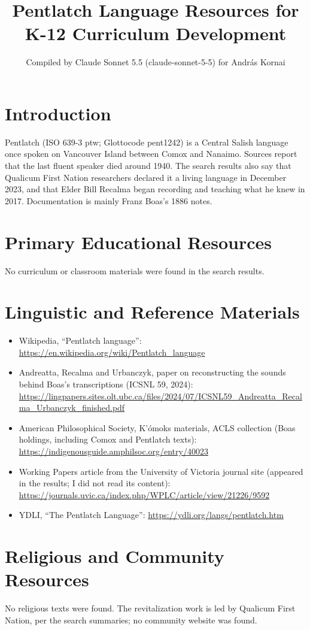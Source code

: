 \documentclass[12pt]{article}
\title{Pentlatch Language Resources for K-12 Curriculum Development}
\author{Compiled by Claude Sonnet 5.5 (claude-sonnet-5-5) for Andr\'as Kornai}
\date{}
\begin{document}
\maketitle

\section{Introduction}
Pentlatch (ISO 639-3 ptw; Glottocode pent1242) is a Central Salish language once spoken on Vancouver Island between Comox and Nanaimo. Sources report that the last fluent speaker died around 1940. The search results also say that Qualicum First Nation researchers declared it a living language in December 2023, and that Elder Bill Recalma began recording and teaching what he knew in 2017. Documentation is mainly Franz Boas's 1886 notes.

\section{Primary Educational Resources}
No curriculum or classroom materials were found in the search results.

\section{Linguistic and Reference Materials}
\begin{itemize}
\item Wikipedia, ``Pentlatch language'': \url{https://en.wikipedia.org/wiki/Pentlatch_language}
\item Andreatta, Recalma and Urbanczyk, paper on reconstructing the sounds behind Boas's transcriptions (ICSNL 59, 2024): \url{https://lingpapers.sites.olt.ubc.ca/files/2024/07/ICSNL59_Andreatta_Recalma_Urbanczyk_finished.pdf}
\item American Philosophical Society, K'\'omoks materials, ACLS collection (Boas holdings, including Comox and Pentlatch texts): \url{https://indigenousguide.amphilsoc.org/entry/40023}
\item Working Papers article from the University of Victoria journal site (appeared in the results; I did not read its content): \url{https://journals.uvic.ca/index.php/WPLC/article/view/21226/9592}
\item YDLI, ``The Pentlatch Language'': \url{https://ydli.org/langs/pentlatch.htm}
\end{itemize}

\section{Religious and Community Resources}
No religious texts were found. The revitalization work is led by Qualicum First Nation, per the search summaries; no community website was found.
\end{document}

